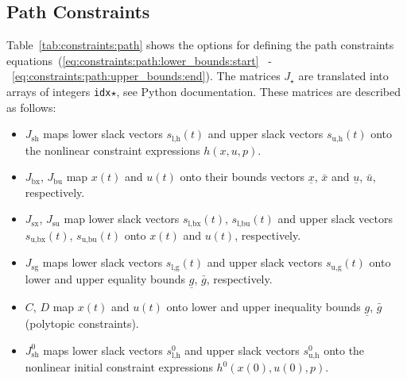 \documentclass[english]{article}
\newcommand{\ind}[1]{_{\textrm{#1}}}
\newcommand{\initial}{^{\textrm{0}}}
\begin{document}
\subsection{Path Constraints}\label{sec:constraints:path}
%
Table~\ref{tab:constraints:path} shows the options for defining the path constraints equations~(\ref{eq:constraints:path:lower_bounds:start} ~-~\ref{eq:constraints:path:upper_bounds:end}).
The matrices $ J_{\star} $ are translated into arrays of integers \texttt{idx}$\star$, see Python documentation.
These matrices are described as follows:
\begin{itemize}
    \item $J\ind{sh}$ maps lower slack vectors $s\ind{l,h}(t)$ and upper slack vectors $s\ind{u,h}(t)$ onto the nonlinear constraint expressions $h(x,u,p)$.
    \item $J\ind{bx}$, $J\ind{bu}$ map $x(t)$ and $u(t)$ onto their bounds vectors $\underline{x}$, $\bar{x}$ and $\underline{u}$, $\bar{u}$, respectively.
    \item $J\ind{sx}$, $J\ind{su}$ map lower slack vectors $s\ind{l,bx}(t)$, $s\ind{l,bu}(t)$ and upper slack vectors $s\ind{u,bx}(t)$, $s\ind{u,bu}(t)$ onto $x(t)$ and $u(t)$, respectively.
    \item $J\ind{sg}$ maps lower slack vectors $s\ind{l,g}(t)$ and upper slack vectors $s\ind{u,g}(t)$ onto lower and upper equality bounds $\underline{g}$, $\bar{g}$, respectively.
    \item $C$, $D$ map $x(t)$ and $u(t)$ onto lower and upper inequality bounds $\underline{g}$, $\bar{g}$ (polytopic constraints).
    \item $J\ind{sh}\initial$ maps lower slack vectors $s\ind{l,h}\initial$ and upper slack vectors $s\ind{u,h}\initial$ onto the nonlinear initial constraint expressions $h\initial(x(0),u(0),p)$.
\end{itemize}
%
\end{document}
